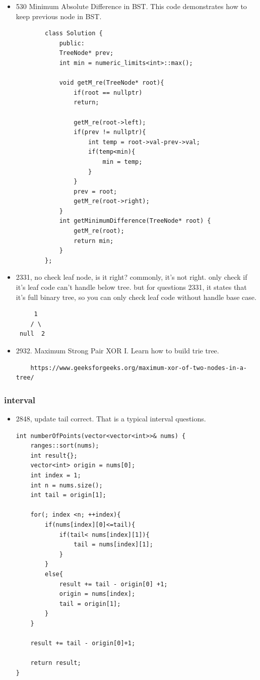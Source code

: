 \documentclass[a4paper,11pt,twoside]{book}
\begin{document}
\begin{itemize}
\begin{lstlisting}
				bool same(TreeNode* p, TreeNode* q) {
					if (!p || !q) {
						return p == q;
					}
					return p->val == q->val && same(p->left, q->left) && same(p->right, q->right);
				}
			};
		\end{lstlisting}
		
	
		\item 530 Minimum Absolute Difference in BST. This code demonstrates how to keep previous node in BST.
	\begin{lstlisting}
		class Solution {
			public:
			TreeNode* prev;
			int min = numeric_limits<int>::max();
			
			void getM_re(TreeNode* root){
				if(root == nullptr)
				return;
				
				getM_re(root->left);
				if(prev != nullptr){
					int temp = root->val-prev->val;
					if(temp<min){
						min = temp;
					}
				}
				prev = root;
				getM_re(root->right);
			}
			int getMinimumDifference(TreeNode* root) {
				getM_re(root);
				return min;      
			}
		};
	\end{lstlisting}
	
	\item 2331, no check leaf node, is it right? commonly, it's not right. only check if it's leaf code can't handle below tree. but for questions 2331, it states that it's full binary tree, so you can only check leaf code without handle base case. 

\begin{lstlisting}
	 1
	/ \
 null  2
\end{lstlisting}

\item 2932. Maximum Strong Pair XOR I. Learn how to build trie tree. 

\begin{lstlisting}
	https://www.geeksforgeeks.org/maximum-xor-of-two-nodes-in-a-tree/
\end{lstlisting}


	
\end{itemize}

\subsubsection{interval}
\begin{itemize}
	\item 2848, update tail correct. That is a typical interval questions. 
\begin{lstlisting}
int numberOfPoints(vector<vector<int>>& nums) {
	ranges::sort(nums);
	int result{};
	vector<int> origin = nums[0];
	int index = 1;
	int n = nums.size();
	int tail = origin[1];
	
	for(; index <n; ++index){
		if(nums[index][0]<=tail){
			if(tail< nums[index][1]){
				tail = nums[index][1];
			}
		}
		else{
			result += tail - origin[0] +1;
			origin = nums[index];
			tail = origin[1];
		}
	}
	
	result += tail - origin[0]+1;
	
	return result;
}	
\end{lstlisting} 	
	
\end{itemize}
\end{document}
